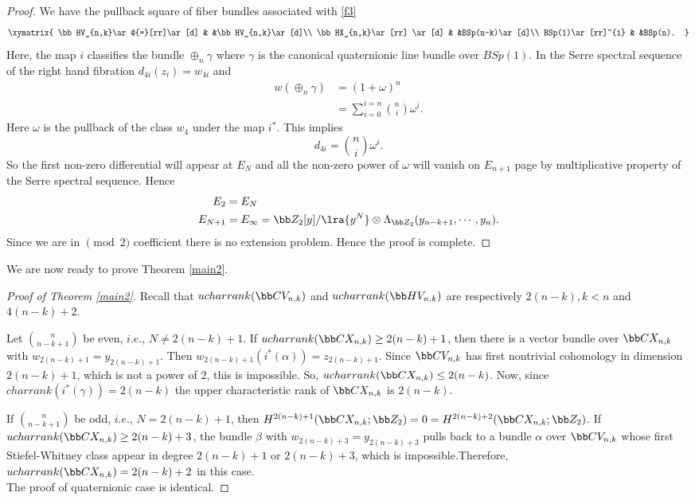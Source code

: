 \begin{proof}
We have the pullback square of fiber bundles associated with \eqref{f3}
\[
\xymatrix{
\bb HV_{n,k}\ar@{=}[rr]\ar[d] & &\bb HV_{n,k}\ar[d]\\
\bb HX_{n,k}\ar[rr] \ar[d] & &BSp(n-k)\ar[d]\\
 BSp(1)\ar[rr]^{i} & &BSp(n).
}
\]
Here, the map $i$ classifies the bundle $\oplus_{n}\gamma$ where $\gamma$ is the canonical quaternionic line bundle over $BSp(1)$. In the Serre spectral sequence of the right hand fibration  $d_{4i}(z_i)=w_{4i}$ and
\begin{align*}
    w(\oplus_{n}\gamma)&=(1+\omega)^n\\
               &=\sum_{i=0}^{i=n}\binom{n}{i}\omega^i.
\end{align*}
Here $\omega$ is the pullback of the class $w_4$ under the map $i^*$. This implies \[d_{4i}=\binom{n}{i}\omega^i.\] So the first non-zero differential will appear at $E_N$ and all the non-zero power of $\omega$ will vanish on $E_{n+1}$ page by multiplicative property of the Serre spectral sequence. Hence 
\begin{align*}
    E_2&=E_N\\
    E_{N+1}&=E_{\infty}=\bb Z_2[y]/\lra{y^N}\otimes \Lambda_{\bb Z_{2}}(y_{n-k+1}, \cdots, y_{n}).
\end{align*}
Since we are in $\pmod 2$ coefficient there is no extension problem. Hence the proof is complete.
\end{proof}

We are now ready to prove Theorem \ref{main2}.

\begin{proof}[Proof of Theorem \ref{main2}]
    Recall that $ucharrank(\bb CV_{n,k})$ and $ucharrank(\bb HV_{n,k})$ are respectively $2(n-k), k<n$ and $4(n-k)+2$.

    Let $\binom{n}{n-k+1}$ be even, $i.e.$, $N\neq 2(n-k)+1$. If $ucharrank(\bb CX_{n,k})\geq 2(n-k)+1$, then there is a vector bundle over $\bb CX_{n,k}$ with $w_{2(n-k)+1}=y_{2(n-k)+1}$. Then $w_{2(n-k)+1}(i^*(\alpha))=z_{2(n-k)+1}$. Since $\bb CV_{n,k}$ has first nontrivial cohomology in dimension $2(n-k)+1$, which is not a power of $2$, this is impossible. So, $ucharrank(\bb CX_{n,k})\leq 2(n-k)$. Now, since $charrank(i^*(\gamma))=2(n-k)$ the upper characteristic rank of $\bb CX_{n,k}$ is $2(n-k)$. 
    
    If $\binom{n}{n-k+1}$ be odd, $i.e.$, $N=2(n-k)+1$, then $H^{2(n-k)+1}(\bb CX_{n,k}; \bb Z_2)=0=H^{2(n-k)+2}(\bb CX_{n,k}; \bb Z_2)$. If $ucharrank(\bb CX_{n, k})\ge 2(n-k)+3$, the bundle $\beta$ with $w_{2(n-k)+3}=y_{2(n-k)+3}$ pulls back to a bundle $\alpha$ over $\bb CV_{n, k}$ whose first Stiefel-Whitney class appear in degree $2(n-k)+1$ or $2(n-k)+3$, which is impossible.Therefore, $ucharrank(\bb CX_{n, k})=2(n-k)+2$ in this case.\\

    The proof of quaternionic case is identical.
\end{proof}



